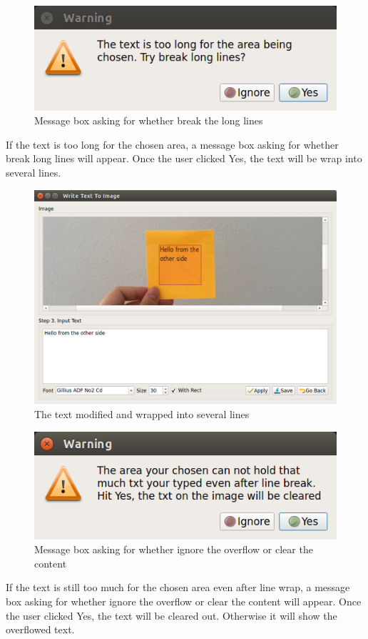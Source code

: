 \documentclass[a4paper, twoside]{report}
\begin{document}
{\begin{itemize}
\begin{figure}[h!]
\centering
\includegraphics[width=.5\textwidth]{big.png}
\caption{Message box asking for whether break the long lines}
\end{figure}

\noindent If the text is too long for the chosen area, a message box asking for whether break long lines will appear. Once the user clicked Yes, the text will be wrap into several lines.  \\ \par

\begin{figure}[h!]
\centering
\includegraphics[width=.9\textwidth]{font.png}
\caption{The text modified and wrapped into several lines}
\end{figure}

\newpage
\begin{figure}[h!]
\centering
\includegraphics[width=.5\textwidth]{big2.png}
\caption{Message box asking for whether ignore the overflow or clear the content}
\end{figure}


\noindent If the text is still too much for the chosen area even after line wrap, a message box asking for whether ignore the overflow or clear the content will appear. Once the user clicked Yes, the text will be cleared out. Otherwise it will show the overflowed text.   \\ \par


\end{itemize}}
\end{document}
